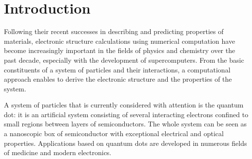 \chapter{Introduction} %
\label{intro}






Following their recent successes in describing and predicting properties of materials, electronic structure calculations using numerical computation have become increasingly important in the fields of physics and chemistry over the past decade, especially with the development of supercomputers. From the basic constituents of a system of particles and their interactions, a computational approach enables to derive the electronic structure and the properties of the system.

A system of particles that is currently considered with attention is the quantum dot: it is an artificial system consisting of several interacting electrons confined to small regions between layers of semiconductors. The whole system can be seen as a nanoscopic box of semiconductor with exceptional electrical and optical properties. Applications based on quantum dots are developed in numerous fields of medicine and modern electronics.

